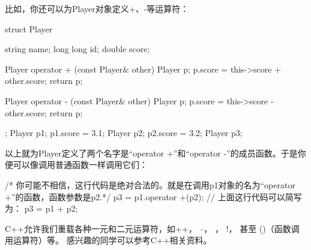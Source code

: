 比如，你还可以为Player对象定义+、-等运算符：
\begin{cppcode}
    struct Player {
        string name;
        long long id;
        double score;   

        Player operator + (const Player& other) {
            Player p;
            p.score = this->score + other.score;
            return p;
        }

        Player operator - (const Player& other) {
            Player p;
            p.score = this->score - other.score;
            return p;
        }
    };
    Player p1; p1.score = 3.1;
    Player p2; p2.score = 3.2;
    Player p3;
\end{cppcode}
以上就为Player定义了两个名字是“operator +”和“operator -”的成员函数。于是你便可以像调用普通函数一样调用它们：
\begin{cppcode}
    /* 你可能不相信，这行代码是绝对合法的。就是在调用p1对象的名为“operator +”的函数，函数参数是p2.*/
    p3 = p1.operator +(p2); 
    // 上面这行代码可以简写为：
    p3 = p1 + p2;
\end{cppcode}
C++允许我们重载各种一元和二元运算符，如\textquotedbl ++\textquotedbl， \textquotedbl --\textquotedbl， 
\textquotedbl *\textquotedbl， \textquotedbl !\textquotedbl， 甚至 \textquotedbl ()\textquotedbl（函数调用运算符）等。
感兴趣的同学可以参考C++相关资料。
